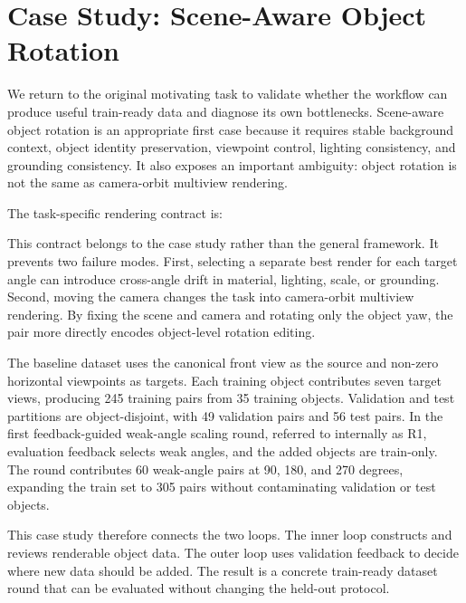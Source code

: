 \section{Case Study: Scene-Aware Object Rotation}
\label{sec:case-study}

We return to the original motivating task to validate whether the workflow can produce useful train-ready data and diagnose its own bottlenecks. Scene-aware object rotation is an appropriate first case because it requires stable background context, object identity preservation, viewpoint control, lighting consistency, and grounding consistency. It also exposes an important ambiguity: object rotation is not the same as camera-orbit multiview rendering.

The task-specific rendering contract is:


This contract belongs to the case study rather than the general framework. It prevents two failure modes. First, selecting a separate best render for each target angle can introduce cross-angle drift in material, lighting, scale, or grounding. Second, moving the camera changes the task into camera-orbit multiview rendering. By fixing the scene and camera and rotating only the object yaw, the pair more directly encodes object-level rotation editing.

The baseline dataset uses the canonical front view as the source and non-zero horizontal viewpoints as targets. Each training object contributes seven target views, producing 245 training pairs from 35 training objects. Validation and test partitions are object-disjoint, with 49 validation pairs and 56 test pairs. In the first feedback-guided weak-angle scaling round, referred to internally as R1, evaluation feedback selects weak angles, and the added objects are train-only. The round contributes 60 weak-angle pairs at 90, 180, and 270 degrees, expanding the train set to 305 pairs without contaminating validation or test objects.

This case study therefore connects the two loops. The inner loop constructs and reviews renderable object data. The outer loop uses validation feedback to decide where new data should be added. The result is a concrete train-ready dataset round that can be evaluated without changing the held-out protocol.

